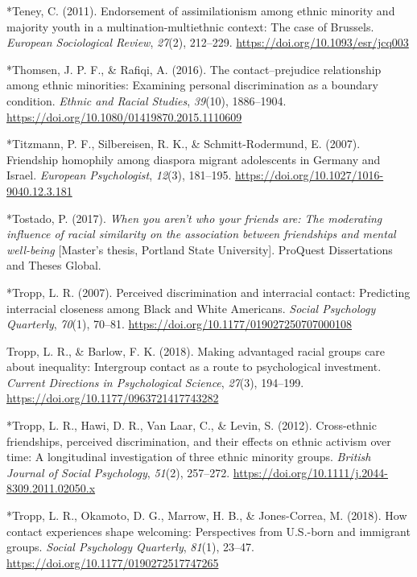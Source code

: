 \documentclass[12pt, letterpaper]{article}
\begin{document}
\leavevmode\hypertarget{ref-46}{}%
*Teney, C. (2011). Endorsement of assimilationism among ethnic minority
and majority youth in a multination-multiethnic context: The case of
Brussels. \emph{European Sociological Review}, \emph{27}(2), 212--229.
\url{https://doi.org/10.1093/esr/jcq003}

\leavevmode\hypertarget{ref-1412}{}%
*Thomsen, J. P. F., \& Rafiqi, A. (2016). The contact--prejudice
relationship among ethnic minorities: Examining personal discrimination
as a boundary condition. \emph{Ethnic and Racial Studies},
\emph{39}(10), 1886--1904.
\url{https://doi.org/10.1080/01419870.2015.1110609}

\leavevmode\hypertarget{ref-1966}{}%
*Titzmann, P. F., Silbereisen, R. K., \& Schmitt-Rodermund, E. (2007).
Friendship homophily among diaspora migrant adolescents in Germany and
Israel. \emph{European Psychologist}, \emph{12}(3), 181--195.
\url{https://doi.org/10.1027/1016-9040.12.3.181}

\leavevmode\hypertarget{ref-1221}{}%
*Tostado, P. (2017). \emph{When you aren't who your friends are: The
moderating influence of racial similarity on the association between
friendships and mental well-being} {[}Master's thesis, Portland State
University{]}. ProQuest Dissertations and Theses Global.

\leavevmode\hypertarget{ref-933}{}%
*Tropp, L. R. (2007). Perceived discrimination and interracial contact:
Predicting interracial closeness among Black and White Americans.
\emph{Social Psychology Quarterly}, \emph{70}(1), 70--81.
\url{https://doi.org/10.1177/019027250707000108}

\leavevmode\hypertarget{ref-tropp_making_2018}{}%
Tropp, L. R., \& Barlow, F. K. (2018). Making advantaged racial groups
care about inequality: Intergroup contact as a route to psychological
investment. \emph{Current Directions in Psychological Science},
\emph{27}(3), 194--199. \url{https://doi.org/10.1177/0963721417743282}

\leavevmode\hypertarget{ref-1743}{}%
*Tropp, L. R., Hawi, D. R., Van Laar, C., \& Levin, S. (2012).
Cross-ethnic friendships, perceived discrimination, and their effects on
ethnic activism over time: A longitudinal investigation of three ethnic
minority groups. \emph{British Journal of Social Psychology},
\emph{51}(2), 257--272.
\url{https://doi.org/10.1111/j.2044-8309.2011.02050.x}

\leavevmode\hypertarget{ref-1658}{}%
*Tropp, L. R., Okamoto, D. G., Marrow, H. B., \& Jones-Correa, M.
(2018). How contact experiences shape welcoming: Perspectives from
U.S.-born and immigrant groups. \emph{Social Psychology Quarterly},
\emph{81}(1), 23--47. \url{https://doi.org/10.1177/0190272517747265}
\end{document}
